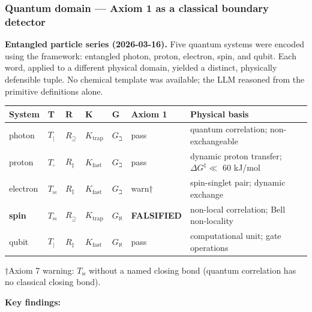 \documentclass[12pt,a4paper]{article}
\begin{document}
\subsubsection{Quantum domain --- Axiom 1 as a classical boundary detector}

\textbf{Entangled particle series (2026-03-16).} Five quantum systems were encoded using the framework: entangled photon, proton, electron, spin, and qubit. Each word, applied to a different physical domain, yielded a distinct, physically defensible tuple. No chemical template was available; the LLM reasoned from the primitive definitions alone.

\begin{table}[htbp]
\centering
\small
{}
\begin{tabularx}{\textwidth}{>{\centering\arraybackslash}X >{\centering\arraybackslash}X >{\centering\arraybackslash}X >{\centering\arraybackslash}X >{\centering\arraybackslash}X >{\centering\arraybackslash}X >{\centering\arraybackslash}X}
\toprule
\rowcolor{gray!25}\textbf{System} & \textbf{T} & \textbf{R} & \textbf{K} & \textbf{G} & \textbf{Axiom 1} & \textbf{Physical basis} \\
\midrule
\rowcolors{1}{white}{gray!10}
photon & $T_{|}$ & $R_{\supseteq}$ & $K_{\text{trap}}$ & $G_{\beth}$ & pass & quantum correlation; non-exchangeable \\
proton & $T_{\square}$ & $R_{\ddagger}$ & $K_{\text{fast}}$ & $G_{\beth}$ & pass & dynamic proton transfer; $\Delta G^{\ddagger} \ll$ 60 kJ/mol \\
electron & $T_{\bowtie}$ & $R_{\ddagger}$ & $K_{\text{fast}}$ & $G_{\beth}$ & warn† & spin-singlet pair; dynamic exchange \\
\textbf{spin} & $T_{\bowtie}$ & $R_{\supseteq}$ & $K_{\text{trap}}$ & $G_{\aleph}$ & \textbf{FALSIFIED} & non-local correlation; Bell non-locality \\
qubit & $T_{|}$ & $R_{\ddagger}$ & $K_{\text{fast}}$ & $G_{\aleph}$ & pass & computational unit; gate operations \\
\bottomrule
\end{tabularx}
\end{table}

†Axiom 7 warning: $T_{\bowtie}$ without a named closing bond (quantum correlation has no classical closing bond).

\textbf{Key findings:}
\end{document}
